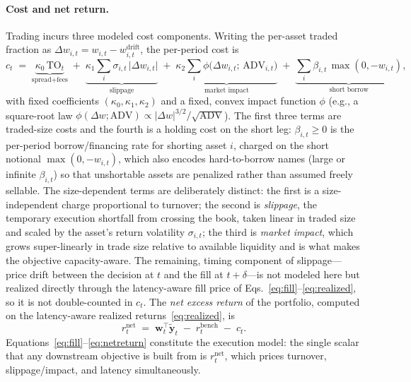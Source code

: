 \documentclass[11pt]{article}
\newcommand{\wt}{\mathbf{w}}
\begin{document}
\paragraph{Cost and net return.}
Trading incurs three modeled cost components. Writing the per-asset traded fraction as
$\Delta w_{i,t}=w_{i,t}-w^{\mathrm{drift}}_{i,t}$, the per-period cost is
\begin{equation}
  c_t \;=\;
  \underbrace{\kappa_0\,\mathrm{TO}_t}_{\text{spread}+\text{fees}}
  \;+\;
  \underbrace{\kappa_1\!\sum_{i}\sigma_{i,t}\,\big|\Delta w_{i,t}\big|}_{\text{slippage}}
  \;+\;
  \underbrace{\kappa_2\!\sum_{i}\phi\!\big(\Delta w_{i,t};\,\mathrm{ADV}_{i,t}\big)}_{\text{market impact}}
  \;+\;
  \underbrace{\sum_{i}\beta_{i,t}\,\max(0,-w_{i,t})}_{\text{short borrow}},
  \label{eq:cost}
\end{equation}
with fixed coefficients $(\kappa_0,\kappa_1,\kappa_2)$ and a fixed, convex impact
function $\phi$ (e.g., a square-root law $\phi(\Delta w;\mathrm{ADV})\propto
|\Delta w|^{3/2}/\sqrt{\mathrm{ADV}}$). The first three terms are traded-size costs and
the fourth is a holding cost on the short leg: $\beta_{i,t}\ge 0$ is the per-period
borrow/financing rate for shorting asset $i$, charged on the short notional
$\max(0,-w_{i,t})$, which also encodes hard-to-borrow names (large or infinite
$\beta_{i,t}$) so that unshortable assets are penalized rather than assumed freely
sellable. The size-dependent terms are deliberately distinct: the
first is a size-independent charge proportional to turnover; the second is
\emph{slippage}, the temporary execution shortfall from crossing the book, taken linear
in traded size and scaled by the asset's return volatility $\sigma_{i,t}$; the third is
\emph{market impact}, which grows super-linearly in trade size relative to available
liquidity and is what makes the objective capacity-aware. The remaining, timing
component of slippage---price drift between the decision at $t$ and the fill at
$t+\delta$---is not modeled here but realized directly through the latency-aware fill
price of Eqs.~\eqref{eq:fill}--\eqref{eq:realized}, so it is not double-counted in $c_t$.
The \emph{net excess return} of the portfolio, computed on the latency-aware realized
returns~\eqref{eq:realized}, is
\begin{equation}
  r^{\mathrm{net}}_{t}
  \;=\; \wt_t^{\!\top}\tilde{\bm{y}}_{t}
  \;-\; r^{\mathrm{bench}}_{t}
  \;-\; c_t .
  \label{eq:netreturn}
\end{equation}
Equations~\eqref{eq:fill}--\eqref{eq:netreturn} constitute the execution model: the
single scalar that any downstream objective is built from is
$r^{\mathrm{net}}_t$, which prices turnover, slippage/impact, and latency
simultaneously.
\end{document}
